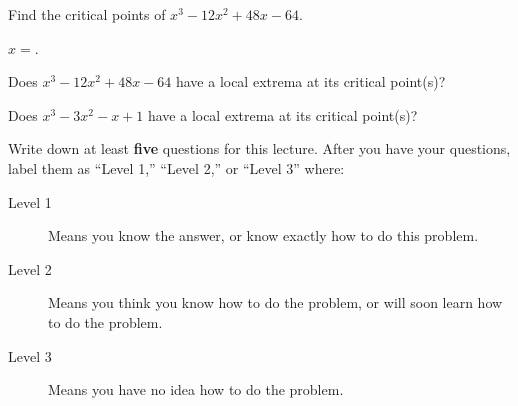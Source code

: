 \documentclass{ximera}
\begin{document}
\begin{question}
  Find the critical points of $x^3-12x^2+48x-64$.
    \begin{prompt}
      $x=$.
    \end{prompt}
\end{question}


\begin{question}
  Does $x^3-12x^2+48x-64$ have a local extrema at its critical point(s)?
    \begin{multipleChoice}
    \end{multipleChoice}
\end{question}

\begin{question}
  Does $x^3-3x^2-x+1$ have a local extrema at its critical point(s)?
    \begin{multipleChoice}
    \end{multipleChoice}
\end{question}

\begin{question}
Write down at least \textbf{five} questions for this lecture. After
you have your questions, label them as ``Level 1,'' ``Level 2,'' or
``Level 3'' where:
\begin{description}
\item[Level 1] Means you know the answer, or know exactly how to do this problem.
\item[Level 2] Means you think you know how to do the problem, or will
  soon learn how to do the problem.
\item[Level 3] Means you have no idea how to do the problem. 
\end{description}
  \begin{freeResponse}
  \end{freeResponse}
\end{question}
\end{document}
